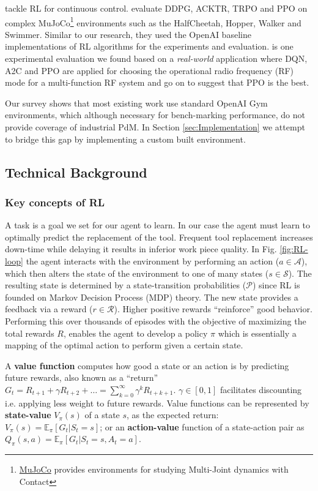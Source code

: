 \documentclass[a4paper, 12pt]{article}
\begin{document}
\cite{dulac2021, henderson2018deep} tackle RL for continuous control. \cite{henderson2018deep} evaluate DDPG, ACKTR, TRPO and PPO on complex MuJoCo\footnote{\href{https://mujoco.org/}{MuJoCo} provides environments for studying Multi-Joint dynamics with Contact} environments such as the HalfCheetah, Hopper, Walker and Swimmer. Similar to our research, they used the OpenAI baseline implementations of RL algorithms for the experiments and evaluation. \cite{ford2022cognitive} is one experimental evaluation we found based on a \textit{real-world} application where DQN, A2C and PPO are applied for choosing the operational radio frequency (RF) mode for a multi-function RF system and go on to suggest that PPO is the best.

Our survey shows that most existing work use standard OpenAI Gym environments, which although necessary for bench-marking performance, do not provide coverage of industrial PdM. In Section \ref{sec:Implementation} we attempt to bridge this gap by implementing a custom built environment.

\subsection{Technical Background}
\subsubsection*{Key concepts of RL}
A task is a goal we set for our agent to learn. In our case the agent must learn to optimally predict the replacement of the tool. Frequent tool replacement increases down-time while delaying it results in inferior work piece quality. In Fig. \ref{fig:RL-loop} the agent interacts with the environment by performing an action ($a \in \mathcal{A}$), which then alters the state of the environment to one of many states ($s \in \mathcal{S}$). The resulting state is determined by a state-transition probabilities ($\mathcal{P}$) since RL is founded on Markov Decision Process (MDP) theory. The new state provides a feedback via a reward ($r \in \mathcal{R}$). Higher positive rewards ``reinforce'' good behavior. Performing this over thousands of episodes with the objective of maximizing the total rewards $R$, enables the agent to develop a policy $\pi$ which is essentially a mapping of the optimal action to perform given a certain state.

A \textbf{value function} computes how good a state or an action is by predicting future rewards, also known as a ``return'' $G_t = R_{t+1} + \gamma R_{t+2} + \dots = \sum_{k=0}^{\infty} \gamma^k R_{t+k+1}$. $\gamma \in [0, 1]$ facilitates discounting i.e. applying less weight to future rewards. Value functions can be represented by \textbf{state-value} $V_{\pi}(s)$ of a state $s$, as the expected return: $V_{\pi}(s) = \mathbb{E}_{\pi}[G_t \vert S_t = s]$; or an \textbf{action-value} function of a state-action pair as $Q_{\pi}(s, a) = \mathbb{E}_{\pi}[G_t \vert S_t = s, A_t = a]$.
\end{document}
